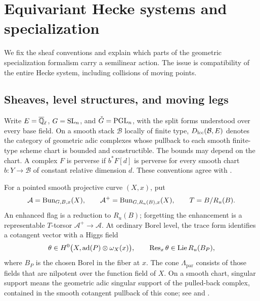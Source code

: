 \section{Equivariant Hecke systems and specialization}\label{sec:conventions}

We fix the sheaf conventions and explain which parts of the geometric
specialization formalism carry a semilinear action. The issue is compatibility
of the entire Hecke system, including collisions of moving points.

\subsection{Sheaves, level structures, and moving legs}

Write $E=\overline{\mathbb Q}_{\ell}$, $G=\mathrm{SL}_n$, and $\check G=\mathrm{PGL}_n$, with the split forms understood
over every base field. On a smooth stack $\mathcal B$ locally of finite type,
$D_{\mathrm{lcc}}(\mathcal B,E)$ denotes the category of geometric adic complexes
whose pullback to each smooth finite-type scheme chart is bounded and
constructible. The bounds may depend on the chart. A complex $F$ is perverse
if $b^*F[d]$ is perverse for every smooth chart $b:Y\to\mathcal B$ of
constant relative dimension $d$. These conventions agree with
\cite[Section~2.1]{CT}.

For a pointed smooth projective curve $(X,x)$, put
\[
 \mathcal A=\operatorname{Bun}_{G,B,x}(X),\qquad
 \mathcal A^+=\operatorname{Bun}_{G,R_u(B),x}(X),\qquad T=B/R_u(B).
\]
An enhanced flag is a reduction to $R_u(B)$; forgetting the enhancement is
a representable $T$-torsor $\mathcal A^+\to\mathcal A$.
At ordinary Borel level, the trace form identifies a cotangent vector with
a Higgs field
\[
 \theta\in H^0\bigl(X,\operatorname{ad}(P)\otimes\omega_X(x)\bigr),
 \qquad \operatorname{Res}_x\theta\in\operatorname{Lie}R_u(B_P),
\]
where $B_P$ is the chosen Borel in the fiber at $x$. The cone
$\Lambda_{\mathrm{par}}$ consists of those fields that are nilpotent over
the function field of $X$. On a smooth chart, singular support means the
geometric adic singular support of the pulled-back complex, contained in
the smooth cotangent pullback of this cone; see
\cite[Section~3.1]{CT} and \cite{Beilinson,Barrett}.


